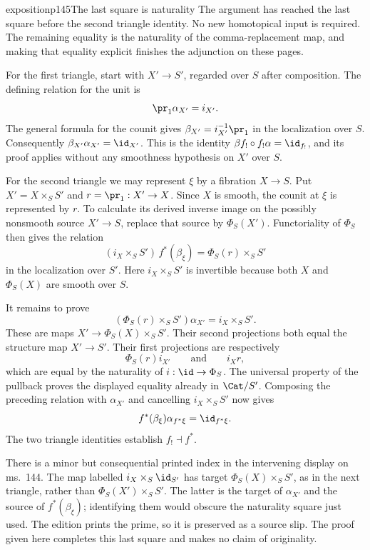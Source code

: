 \begin{dcomment}{exposition}{p145}{The last square is naturality}
The argument has reached the last square before the second triangle identity. No new homotopical input is required. The remaining equality is the naturality of the comma-replacement map, and making that equality explicit finishes the adjunction on these pages.

For the first triangle, start with $X'\to S'$, regarded over $S$ after composition. The defining relation for the unit is
\[
 \pr_1\alpha_{X'}=i_{X'}.
\]
The general formula for the counit gives $\beta_{X'}=i_{X'}^{-1}\pr_1$ in the localization over $S$. Consequently $\beta_{X'}\alpha_{X'}=\id_{X'}$. This is the identity $\beta f_!\circ f_!\alpha=\id_{f_!}$, and its proof applies without any smoothness hypothesis on $X'$ over $S$.

For the second triangle we may represent $\xi$ by a fibration $X\to S$. Put $X'=X\times_S S'$ and $r=\pr_1:X'\to X$. Since $X$ is smooth, the counit at $\xi$ is represented by $r$. To calculate its derived inverse image on the possibly nonsmooth source $X'\to S$, replace that source by $\Phi_S(X')$. Functoriality of $\Phi_S$ then gives the relation
\[
 (i_X\times_S S')\,f^*(\beta_\xi)
 =\Phi_S(r)\times_S S'
\]
in the localization over $S'$. Here $i_X\times_S S'$ is invertible because both $X$ and $\Phi_S(X)$ are smooth over $S$.

It remains to prove
\[
 (\Phi_S(r)\times_S S')\alpha_{X'}=i_X\times_S S'.
\]
These are maps $X'\to\Phi_S(X)\times_S S'$. Their second projections both equal the structure map $X'\to S'$. Their first projections are respectively
\[
 \Phi_S(r)i_{X'}\qquad\text{and}\qquad i_Xr,
\]
which are equal by the naturality of $i:\id\to\Phi_S$. The universal property of the pullback proves the displayed equality already in $\Cat/S'$. Composing the preceding relation with $\alpha_{X'}$ and cancelling $i_X\times_S S'$ now gives
\[
 f^*(\beta_\xi)\alpha_{f^*\xi}=\id_{f^*\xi}.
\]
The two triangle identities establish $f_!\dashv f^*$.

There is a minor but consequential printed index in the intervening display on ms.~144. The map labelled $i_X\times_S\id_{S'}$ has target $\Phi_S(X)\times_S S'$, as in the next triangle, rather than $\Phi_S(X')\times_S S'$. The latter is the target of $\alpha_{X'}$ and the source of $f^*(\beta_\xi)$; identifying them would obscure the naturality square just used. The edition prints the prime, so it is preserved as a source slip. The proof given here completes this last square and makes no claim of originality.
\end{dcomment}


